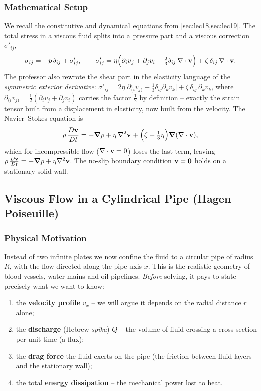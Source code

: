 \documentclass[../main.tex]{subfiles}
\begin{document}
\subsubsection*{Mathematical Setup}
We recall the constitutive and dynamical equations from \cref{sec:lec18,sec:lec19}. The total stress in a viscous fluid splits into a pressure part and a viscous correction $\sigma'_{ij}$,
\begin{equation}
  \sigma_{ij}=-p\,\delta_{ij}+\sigma'_{ij},\qquad
  \sigma'_{ij}=\eta\Big(\partial_i v_j+\partial_j v_i-\tfrac23\delta_{ij}\,\nabla \cdot\mathbf{v}\Big)+\zeta\,\delta_{ij}\,\nabla \cdot\mathbf{v} .
  \label{eq:lec20_stress}
\end{equation}
The professor also rewrote the shear part in the elasticity language of the \emph{symmetric exterior derivative}: $\sigma'_{ij}=2\eta\big[\partial_{(i}v_{j)}-\tfrac13\delta_{ij}\partial_k v_k\big]+\zeta\,\delta_{ij}\,\partial_k v_k$, where $\partial_{(i}v_{j)}=\tfrac12(\partial_i v_j+\partial_j v_i)$ carries the factor $\tfrac12$ by definition -- exactly the strain tensor built from a displacement in elasticity, now built from the velocity. The Navier--Stokes equation is
\begin{equation}
  \rho\,\frac{D\mathbf{v}}{Dt}
    = -\grad p + \eta\,\nabla^2\mathbf{v} + \Big(\zeta+\tfrac13\eta\Big)\grad(\nabla \cdot\mathbf{v}),
  \label{eq:lec20_NS}
\end{equation}
which for incompressible flow ($\nabla \cdot\mathbf{v}=0$) loses the last term, leaving $\rho\,\frac{D\mathbf{v}}{Dt}=-\grad p+\eta\nabla^2\mathbf{v}$. The no-slip boundary condition $\mathbf{v}=\mathbf{0}$ holds on a stationary solid wall.

\subsection{Viscous Flow in a Cylindrical Pipe (Hagen--Poiseuille)}\label{sec:lec20:pipe}

\subsubsection*{Physical Motivation}
Instead of two infinite plates we now confine the fluid to a circular pipe of radius $R$, with the flow directed along the pipe axis $x$. This is the realistic geometry of blood vessels, water mains and oil pipelines. \emph{Before} solving, it pays to state precisely what we want to know:
\begin{enumerate}
  \item the \textbf{velocity profile} $v_x$ -- we will argue it depends on the radial distance $r$ alone;
  \item the \textbf{discharge} (Hebrew \emph{spika}) $Q$ -- the volume of fluid crossing a cross-section per unit time (a flux);
  \item the \textbf{drag force} the fluid exerts on the pipe (the friction between fluid layers and the stationary wall);
  \item the total \textbf{energy dissipation} -- the mechanical power lost to heat.
\end{enumerate}
\end{document}
